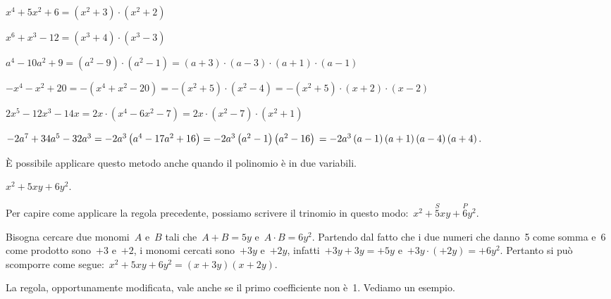 \begin{exrig}
\begin{esempio}
\begin{itemize*}
\item $x^{4}+5x^{2}+6=\left(x^{2}+3\right)\cdot \left(x^{2}+2\right)$
\item $x^{6}+x^{3}-12=\left(x^{3}+4\right)\cdot \left(x^{3}-3\right)$
\item $a^{4}-10a^{2}+9=\left(a^{2}-9\right)\cdot\left(a^{2}-1\right)=
       \left(a+3\right)\cdot \left(a-3\right)\cdot 
       \left(a+1\right)\cdot\left(a-1\right)$
\item $-x^{4}-x^{2}+20=-\left(x^{4}+x^{2}-20\right)=
       -\left(x^{2}+5\right)\cdot\left(x^{2}-4\right)=
       -\left(x^{2}+5\right)\cdot\left(x+2\right)\cdot \left(x-2\right)$
\item $2x^{5}-12x^{3}-14x=2x\cdot \left(x^{4}-6x^{2}-7\right)=2x\cdot%
\left(x^{2}-7\right)\cdot \left(x^{2}+1\right)$
\item $-2a^{7}+34a^{5}-32a^{3}=-2a^{3}\left(a^{4}-17a^{2}+16\right)
    =-2a^{3}\left(a^{2}-1\right)\left(a^{2}-16\right)\\
    =-2a^{3}\left(a-1\right)\left(a+1\right)\left(a-4\right)\left(a+4\right).$
\end{itemize*}
\end{esempio}

\end{exrig}

È possibile applicare questo metodo anche quando il
polinomio è in due variabili.

\begin{exrig}
 \begin{esempio}
 $x^{2}+5xy+6y^{2}$.

 Per capire come applicare la regola precedente, possiamo scrivere il
trinomio in questo modo:~$x^{2}+\overset{S}{5}xy+\overset{P}{6}y{^{2}}$.

Bisogna cercare due monomi~$A$ e~$B$ tali che~$A+B=5y$
e~$A\cdot B=6y^{2}$. Partendo dal fatto che i due numeri che danno~5
come somma e~6 come prodotto sono~$+3$ e~$+2$, i monomi cercati 
sono~$+3y$ e~$+2y$, infatti~$+3y+3y=+5y$ e~$+3y\cdot (+2y)=+6y^{2}$. 
Pertanto si può scomporre come segue:~$x^{2}+5xy+6y^{2}=(x+3y)(x+2y)$.
 \end{esempio}
\end{exrig}

La regola, opportunamente modificata, vale anche se il primo
coefficiente non è~1. Vediamo un esempio.

